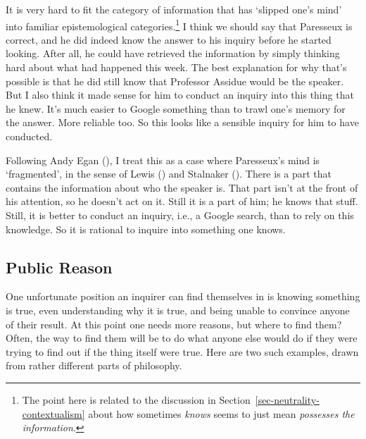\documentclass[
  10pt,
  letterpaper,
  twoside]{scrbook}
\begin{document}
It is very hard to fit the category of information that has `slipped
one's mind' into familiar epistemological categories.\footnote{The point
  here is related to the discussion in
  Section~\ref{sec-neutrality-contextualism} about how sometimes
  \emph{knows} seems to just mean \emph{possesses the information}.} I
think we should say that Paresseux is correct, and he did indeed know
the answer to his inquiry before he started looking. After all, he could
have retrieved the information by simply thinking hard about what had
happened this week. The best explanation for why that's possible is that
he did still know that Professor Assidue would be the speaker. But I
also think it made sense for him to conduct an inquiry into this thing
that he knew. It's much easier to Google something than to trawl one's
memory for the answer. More reliable too. So this looks like a sensible
inquiry for him to have conducted.

Following Andy Egan (), I treat this as a
case where Paresseux's mind is `fragmented', in the sense of Lewis
() and Stalnaker
(). There is a part that contains the
information about who the speaker is. That part isn't at the front of
his attention, so he doesn't act on it. Still it is a part of him; he
knows that stuff. Still, it is better to conduct an inquiry, i.e., a
Google search, than to rely on this knowledge. So it is rational to
inquire into something one knows.

\subsection{Public Reason}\label{sec-rawlsinquiry}

One unfortunate position an inquirer can find themselves in is knowing
something is true, even understanding why it is true, and being unable
to convince anyone of their result. At this point one needs more
reasons, but where to find them? Often, the way to find them will be to
do what anyone else would do if they were trying to find out if the
thing itself were true. Here are two such examples, drawn from rather
different parts of philosophy.
\end{document}

